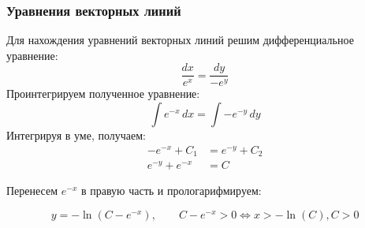\begin{frame}\frametitle{Уравнения векторных линий}

Для нахождения уравнений векторных линий решим дифференциальное уравнение:
  \begin{equation}
    \frac{dx}{e^x} = \frac{dy}{-e^y}
    \label{eq:vec_lines}
  \end{equation}
Проинтегрируем полученное уравнение:
  \begin{equation}
    \int e^{-x} \, dx = \int -e^{-y} \, dy
    \label{eq:vec_lines_int}
  \end{equation}
Интегрируя в уме, получаем:
  \begin{align*}
    -e^{-x} + C_1       &= e^{-y} + C_2 \\
    e^{-y}  + e^{-x}   &= C
    \label{eq:vec_lines_integrated}
  \end{align*}

  Перенесем \(e^{-x}\) в правую часть и прологарифмируем:

  \begin{equation}
    y = - \ln(C - e^{-x}), \qquad
    C - e^{-x} > 0 \Longleftrightarrow x > - \ln(C), C > 0
    \label{eq:vec_lines_final}
  \end{equation}

\end{frame}
